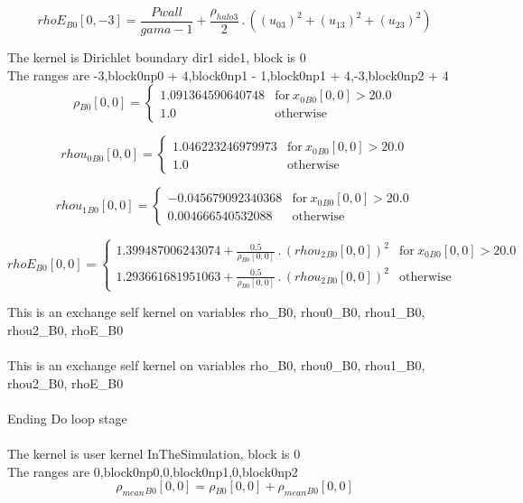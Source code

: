 \documentclass{article}
\begin{document}
\begin{dmath}{rhoE{_{B0}}}[{0,-3}] = \frac{Pwall}{gama - 1} + \frac{\rho_{halo 3}}{2} \,.\, \left(\left(u_{03} \right)^{2} + \left(u_{13} \right)^{2} + \left(u_{23} \right)^{2}\right)\end{dmath}

\noindent The kernel is Dirichlet boundary dir1 side1, block is 0\\\noindent The ranges are -3,block0np0 + 4,block0np1 - 1,block0np1 + 4,-3,block0np2 + 4\\\begin{dmath}{\rho{_{B0}}}[{0,0}] = \begin{cases} 1.091364590640748 & \text{for}\: {x_{0}{_{B0}}}[{0,0}] > 20.0 \\1.0 & \text{otherwise} \end{cases}\end{dmath}

\begin{dmath}{rhou_{0}{_{B0}}}[{0,0}] = \begin{cases} 1.046223246979973 & \text{for}\: {x_{0}{_{B0}}}[{0,0}] > 20.0 \\1.0 & \text{otherwise} \end{cases}\end{dmath}

\begin{dmath}{rhou_{1}{_{B0}}}[{0,0}] = \begin{cases} -0.045679092340368 & \text{for}\: {x_{0}{_{B0}}}[{0,0}] > 20.0 \\0.004666540532088 & \text{otherwise} \end{cases}\end{dmath}

\begin{dmath}{rhoE{_{B0}}}[{0,0}] = \begin{cases} 1.399487006243074 + \frac{0.5}{{\rho{_{B0}}}[{0,0}]} \,.\, \left({rhou_{2}{_{B0}}}[{0,0}] \right)^{2} & \text{for}\: {x_{0}{_{B0}}}[{0,0}] > 20.0 \\1.293661681951063 + \frac{0.5}{{\rho{_{B0}}}[{0,0}]} 
\,.\, \left({rhou_{2}{_{B0}}}[{0,0}] \right)^{2} & \text{otherwise} \end{cases}\end{dmath}

\noindent This is an exchange self kernel on variables rho_B0, rhou0_B0, rhou1_B0, rhou2_B0, rhoE_B0\\\\\noindent This is an exchange self kernel on variables rho_B0, rhou0_B0, rhou1_B0, rhou2_B0, rhoE_B0\\\\\noindent Ending Do loop stage\\
\\\noindent The kernel is user kernel InTheSimulation, block is 0\\\noindent The ranges are 0,block0np0,0,block0np1,0,block0np2\\\begin{dmath}{\rho_{mean}{_{B0}}}[{0,0}] = {\rho{_{B0}}}[{0,0}] + {\rho_{mean}{_{B0}}}[{0,0}]\end{dmath}
\end{document}
